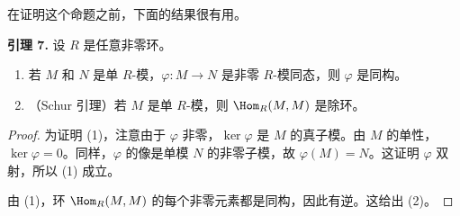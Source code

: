 在证明这个命题之前，下面的结果很有用。

\medskip
\noindent\textbf{引理 7.} 设 $R$ 是任意非零环。
\begin{enumerate}[label=(\arabic*)]
  \item 若 $M$ 和 $N$ 是单 $R$-模，$\varphi:M\to N$ 是非零 $R$-模同态，则 $\varphi$ 是同构。
  \item （Schur 引理）若 $M$ 是单 $R$-模，则 $\Hom_R(M,M)$ 是除环。
\end{enumerate}

\begin{proof}
为证明 (1)，注意由于 $\varphi$ 非零，$\ker\varphi$ 是 $M$ 的真子模。由 $M$ 的单性，$\ker\varphi=0$。同样，$\varphi$ 的像是单模 $N$ 的非零子模，故 $\varphi(M)=N$。这证明 $\varphi$ 双射，所以 (1) 成立。

由 (1)，环 $\Hom_R(M,M)$ 的每个非零元素都是同构，因此有逆。这给出 (2)。
\end{proof}

